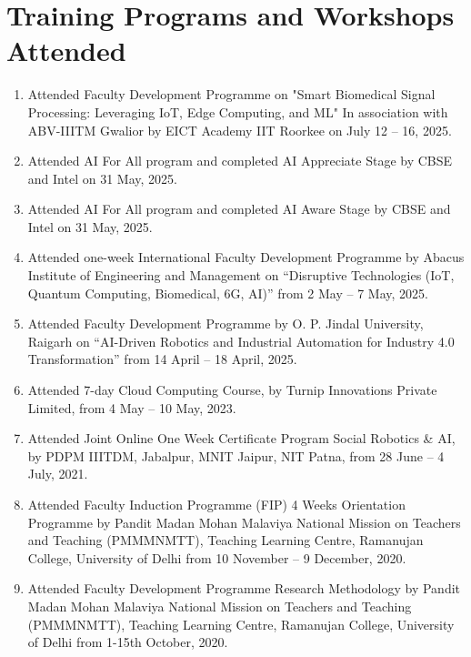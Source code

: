 \documentclass[11pt,a4paper]{moderncv}
\begin{document}
\section{\textbf{Training Programs and Workshops Attended}}

\begin{adjustwidth}{6em}{0pt}
	\begin{enumerate}
		
		\item Attended Faculty Development Programme on "Smart Biomedical Signal Processing: Leveraging IoT, Edge Computing, and ML" In association with ABV-IIITM Gwalior by EICT Academy IIT Roorkee on July 12 – 16, 2025.
				
		\item Attended AI For All program and completed AI Appreciate Stage by CBSE and Intel on 31 May, 2025.
		
		\item Attended AI For All program and completed AI Aware Stage by CBSE and Intel on 31 May, 2025.
		
		\item Attended one-week International Faculty Development Programme by Abacus Institute of Engineering and Management on “Disruptive Technologies (IoT, Quantum Computing, Biomedical, 6G, AI)” from 2 May – 7 May, 2025.
		
		\item Attended Faculty Development Programme by O. P. Jindal University, Raigarh on “AI-Driven Robotics and Industrial Automation for Industry 4.0 Transformation” from 14 April – 18 April, 2025.
		
		\item Attended 7-day Cloud Computing Course, by Turnip Innovations Private Limited, from 4 May – 10 May, 2023.
		
		\item Attended Joint Online One Week Certificate Program Social Robotics \& AI, by PDPM IIITDM, Jabalpur, MNIT Jaipur, NIT Patna, from 28 June – 4 July, 2021.
		
		\item Attended Faculty Induction Programme (FIP) 4 Weeks Orientation Programme by Pandit Madan Mohan Malaviya National Mission on Teachers and Teaching (PMMMNMTT), Teaching Learning Centre, Ramanujan College, University of Delhi from 10 November – 9 December, 2020.
		
		\item Attended Faculty Development Programme Research Methodology by Pandit Madan Mohan Malaviya National Mission on Teachers and Teaching (PMMMNMTT), Teaching Learning Centre, Ramanujan College, University of Delhi from 1-15th October, 2020.
		

\end{enumerate}
\end{adjustwidth}
\end{document}
